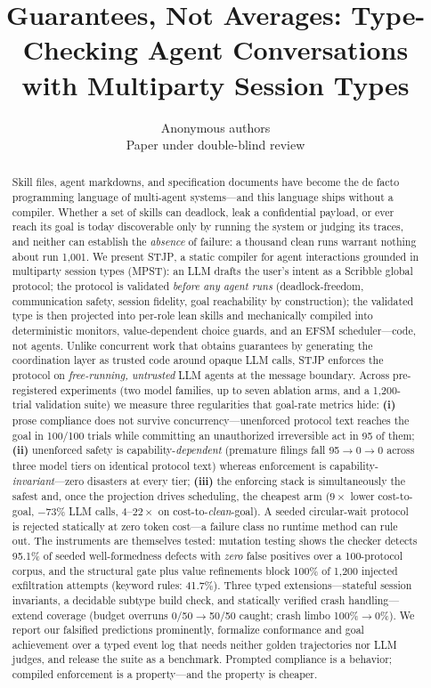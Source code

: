 \documentclass{article}
\title{\bf Guarantees, Not Averages: Type-Checking Agent Conversations\\ with Multiparty Session Types}
\author{Anonymous authors\\ \small Paper under double-blind review}
\date{}
\newcommand{\stjp}{\textsc{STJP}}
\begin{document}
\maketitle

\begin{abstract}
Skill files, agent markdowns, and specification documents have become the de facto programming language of multi-agent systems---and this language ships without a compiler. Whether a set of skills can deadlock, leak a confidential payload, or ever reach its goal is today discoverable only by running the system or judging its traces, and neither can establish the \emph{absence} of failure: a thousand clean runs warrant nothing about run 1{,}001. We present \stjp{}, a static compiler for agent interactions grounded in multiparty session types (MPST): an LLM drafts the user's intent as a Scribble global protocol; the protocol is validated \emph{before any agent runs} (deadlock-freedom, communication safety, session fidelity, goal reachability by construction); the validated type is then projected into per-role lean skills and mechanically compiled into deterministic monitors, value-dependent choice guards, and an EFSM scheduler---code, not agents. Unlike concurrent work that obtains guarantees by generating the coordination layer as trusted code around opaque LLM calls, \stjp{} enforces the protocol on \emph{free-running, untrusted} LLM agents at the message boundary. Across pre-registered experiments (two model families, up to seven ablation arms, and a 1{,}200-trial validation suite) we measure three regularities that goal-rate metrics hide: \textbf{(i)} prose compliance does not survive concurrency---unenforced protocol text reaches the goal in 100/100 trials while committing an unauthorized irreversible act in 95 of them; \textbf{(ii)} unenforced safety is capability-\emph{dependent} (premature filings fall 95$\to$0$\to$0 across three model tiers on identical protocol text) whereas enforcement is capability-\emph{invariant}---zero disasters at every tier; \textbf{(iii)} the enforcing stack is simultaneously the safest and, once the projection drives scheduling, the cheapest arm ($9\times$ lower cost-to-goal, $-73\%$ LLM calls, $4$--$22\times$ on cost-to-\emph{clean}-goal). A seeded circular-wait protocol is rejected statically at zero token cost---a failure class no runtime method can rule out. The instruments are themselves tested: mutation testing shows the checker detects 95.1\% of seeded well-formedness defects with \emph{zero} false positives over a 100-protocol corpus, and the structural gate plus value refinements block 100\% of 1{,}200 injected exfiltration attempts (keyword rules: 41.7\%). Three typed extensions---stateful session invariants, a decidable subtype build check, and statically verified crash handling---extend coverage (budget overruns 0/50$\to$50/50 caught; crash limbo 100\%$\to$0\%). We report our falsified predictions prominently, formalize conformance and goal achievement over a typed event log that needs neither golden trajectories nor LLM judges, and release the suite as a benchmark. Prompted compliance is a behavior; compiled enforcement is a property---and the property is cheaper.
\end{abstract}
\end{document}
